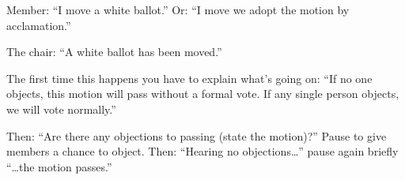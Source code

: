 Member: ``I move a white ballot.''  Or: ``I move we adopt the motion
by acclamation.''

The chair: ``A white ballot has been moved.''

The first time this happens you have to explain what's going on:
``If no one objects, this motion will
pass without a formal vote.  If any single person objects, we will
vote normally.''

Then: ``Are there any objections to passing (state the motion)?''
Pause to give members a chance to object.  Then: ``Hearing no
objections\ldots'' pause again briefly ``\ldots the motion passes.''


